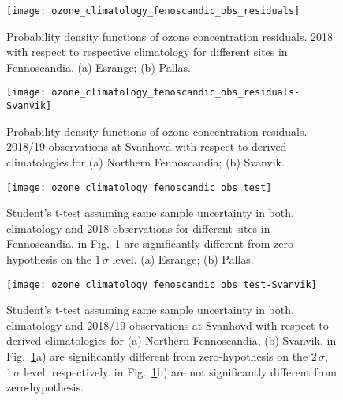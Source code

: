 \documentclass[bg, manuscript]{copernicus}
\begin{document}
\begin{figure}[t]
  \texttt{[image: ozone\_climatology\_fenoscandic\_obs\_residuals]}
  \caption{Probability density functions of ozone concentration residuals. 2018 with respect to respective climatology for different sites in Fennoscandia. (a) Esrange; (b) Pallas.}
  \label{fig:ozone_climatology_fenoscandic_obs_residuals}
\end{figure}

\begin{figure}[t]
  \texttt{[image: ozone\_climatology\_fenoscandic\_obs\_residuals-Svanvik]}
  \caption{Probability density functions of ozone concentration residuals. 2018/19 observations at Svanhovd with respect to derived climatologies for (a) Northern Fennoscandia; (b) Svanvik.}
  \label{fig:ozone_climatology_fenoscandic_obs_residuals-Svanvik}
\end{figure}

\begin{figure}[t]
  \texttt{[image: ozone\_climatology\_fenoscandic\_obs\_test]}
  \caption{Student's t-test assuming same sample uncertainty in both, climatology and 2018 observations for different sites in Fennoscandia. \chem{\Delta[O_3]} in Fig.~\ref{fig:ozone_climatology_fenoscandic_obs_residuals} are significantly different from zero-hypothesis on the $1\,\sigma$ level. (a) Esrange; (b) Pallas.}
  \label{fig:ozone_climatology_fenoscandic_obs_test}
\end{figure}

\begin{figure}[t]
  \texttt{[image: ozone\_climatology\_fenoscandic\_obs\_test-Svanvik]}
  \caption{Student's t-test assuming same sample uncertainty in both, climatology and 2018/19 observations at Svanhovd with respect to derived climatologies for (a) Northern Fennoscandia; (b) Svanvik. \chem{\Delta[O_3]} in Fig.~\ref{fig:ozone_climatology_fenoscandic_obs_residuals}a) are significantly different from zero-hypothesis on the $2\,\sigma$,  $1\,\sigma$ level, respectively. \chem{\Delta[O_3]} in Fig.~\ref{fig:ozone_climatology_fenoscandic_obs_residuals}b) are not significantly different from zero-hypothesis.}
  \label{fig:ozone_climatology_fenoscandic_obs_test-Svanvik}
\end{figure}
\clearpage

\noappendix       %

\end{document}
